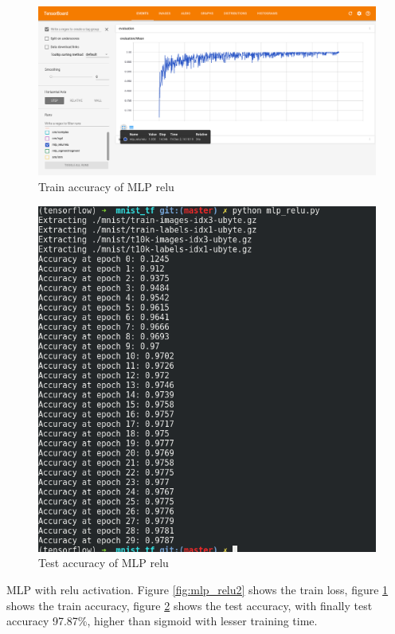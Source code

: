 \documentclass[10pt,twocolumn,letterpaper]{article}
\begin{document}
\begin{CJK}{UTF8}{gbsn}
\begin{figure}
\begin{center}
   \includegraphics[width=0.9\linewidth]{mlp_relu1.png}
\end{center}
\caption{Train accuracy of MLP relu}
\label{fig:mlp_relu1}
\end{figure}

\begin{figure}
\begin{center}
   \includegraphics[width=0.9\linewidth]{mlp_relu3.png}
\end{center}
\caption{Test accuracy of MLP relu}
\label{fig:mlp_relu3}
\end{figure}

MLP with relu activation. Figure \ref{fig:mlp_relu2} shows the train loss, figure \ref{fig:mlp_relu1} shows the train accuracy, figure \ref{fig:mlp_relu3} shows the test accuracy, with finally test accuracy 97.87\%, higher than sigmoid with lesser training time. 


\end{CJK}
\end{document}
